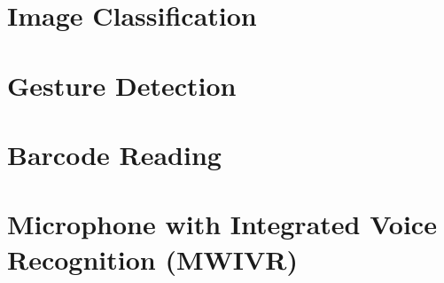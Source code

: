 \documentclass[10pt,a4paper,bibliography=totoc]{scrbook}
\begin{document}
{{}

\Ausblenden
{
	
}

\Ausblenden
{	
\part{Image Classification}

}

\Ausblenden
{
\part{}
 
  
} 

\Ausblenden
{
\part{Gesture Detection}

  
}

\Ausblenden
{
    
\part{Barcode Reading}

}  

\Ausblenden
{
  \part{Microphone with Integrated Voice Recognition (MWIVR)}
 
   
  
  
}

}
\end{document}
